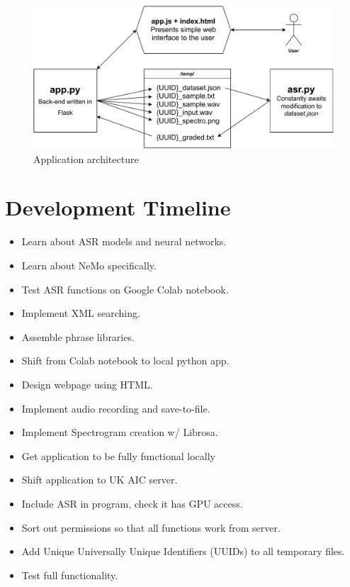 \documentclass[12pt, letterpaper]{article}
\begin{document}
\begin{figure}[h!]
    \centering
    \includegraphics[scale=0.8]{images/workflow.pdf}
    \caption{Application architecture}
\end{figure}

\newpage%
\section*{Development Timeline} \label{timeline}
\begin{itemize}
\item{Learn about ASR models and neural networks.}
\item{Learn about NeMo specifically.}
\item{Test ASR functions on Google Colab notebook.}
\item{Implement XML searching.}
\item{Assemble phrase libraries.}
\item{Shift from Colab notebook to local python app.}
\item{Design webpage using HTML.}
\item{Implement audio recording and save-to-file.}
\item{Implement Spectrogram creation w/ Librosa.}
\item{Get application to be fully functional locally}
\item{Shift application to UK AIC server.}
\item{Include ASR in program, check it has GPU access.}
\item{Sort out permissions so that all functions work from server.}
\item{Add Unique Universally Unique Identifiers (UUIDs) to all temporary files.}
\item{Test full functionality.}
\end{itemize}
\end{document}
